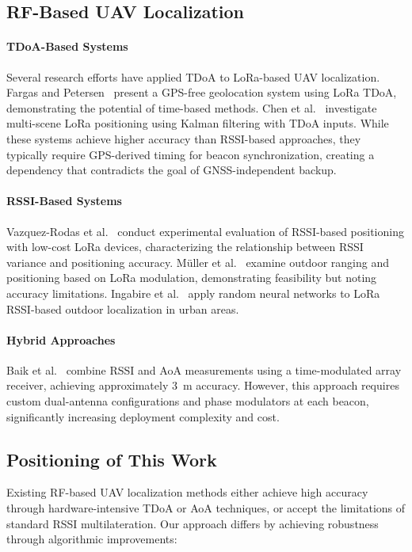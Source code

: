 \documentclass[master,final,11pt]{iscs-thesis}
\begin{document}
\subsection{RF-Based UAV Localization}

\paragraph{TDoA-Based Systems}
Several research efforts have applied TDoA to LoRa-based UAV localization.
Fargas and Petersen~\cite{fargas2017gps} present a GPS-free geolocation system using LoRa TDoA, demonstrating the potential of time-based methods.
Chen et al.~\cite{ref_tdoa_lora} investigate multi-scene LoRa positioning using Kalman filtering with TDoA inputs.
While these systems achieve higher accuracy than RSSI-based approaches, they typically require GPS-derived timing for beacon synchronization, creating a dependency that contradicts the goal of GNSS-independent backup.

\paragraph{RSSI-Based Systems}
Vazquez-Rodas et al.~\cite{vazquez2020rssi} conduct experimental evaluation of RSSI-based positioning with low-cost LoRa devices, characterizing the relationship between RSSI variance and positioning accuracy.
M\"uller et al.~\cite{muller2021outdoor} examine outdoor ranging and positioning based on LoRa modulation, demonstrating feasibility but noting accuracy limitations.
Ingabire et al.~\cite{ingabire2021lora} apply random neural networks to LoRa RSSI-based outdoor localization in urban areas.

\paragraph{Hybrid Approaches}
Baik et al.~\cite{ref_aoa_lora} combine RSSI and AoA measurements using a time-modulated array receiver, achieving approximately 3~m accuracy.
However, this approach requires custom dual-antenna configurations and phase modulators at each beacon, significantly increasing deployment complexity and cost.

\subsection{Positioning of This Work}

Existing RF-based UAV localization methods either achieve high accuracy through hardware-intensive TDoA or AoA techniques, or accept the limitations of standard RSSI multilateration.
Our approach differs by achieving robustness through algorithmic improvements:
\end{document}
